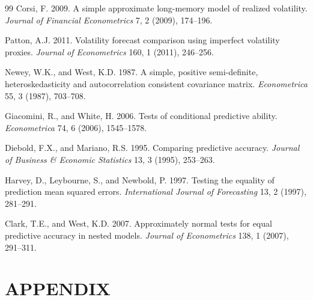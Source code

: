 \documentclass[12pt,oneside]{report}
\newcommand{\frontchapter}[1]{%
  \chapter*{#1}\addcontentsline{toc}{chapter}{#1}}
\begin{document}
\begin{thebibliography}{99}
Corsi, F. 2009. A simple approximate long-memory model of realized
volatility. \emph{Journal of Financial Econometrics} 7, 2 (2009),
174--196.

Patton, A.J. 2011. Volatility forecast comparison using imperfect
volatility proxies. \emph{Journal of Econometrics} 160, 1 (2011),
246--256.

Newey, W.K., and West, K.D. 1987. A simple, positive semi-definite,
heteroskedasticity and autocorrelation consistent covariance matrix.
\emph{Econometrica} 55, 3 (1987), 703--708.

Giacomini, R., and White, H. 2006. Tests of conditional predictive
ability. \emph{Econometrica} 74, 6 (2006), 1545--1578.

Diebold, F.X., and Mariano, R.S. 1995. Comparing predictive accuracy.
\emph{Journal of Business \& Economic Statistics} 13, 3 (1995),
253--263.

Harvey, D., Leybourne, S., and Newbold, P. 1997. Testing the equality of
prediction mean squared errors. \emph{International Journal of
Forecasting} 13, 2 (1997), 281--291.

Clark, T.E., and West, K.D. 2007. Approximately normal tests for equal
predictive accuracy in nested models. \emph{Journal of Econometrics}
138, 1 (2007), 291--311.

\end{thebibliography}
\endgroup

\appendix
\frontchapter{APPENDIX}

\end{document}
